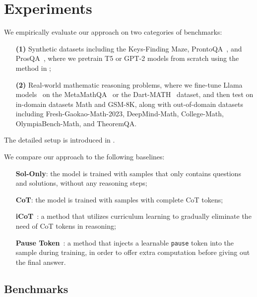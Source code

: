 \section{Experiments}
\label{sec:expr}
We empirically evaluate our approach on two categories of benchmarks: 
\vspace{-5pt}
\begin{enumerate}\itemsep0pt
    \item[\textbf{(1)}] Synthetic datasets including the Keys-Finding Maze, ProntoQA~\cite{saparov2022language}, and ProsQA~\cite{hao2024training}, where we pretrain T5 or GPT-2 models from scratch using the method in ;
    \item[\textbf{(2)}] Real-world mathematic reasoning problems, where we fine-tune Llama models~\cite{dubey2024llama} on the MetaMathQA~\cite{yu2023metamath} or the Dart-MATH~\cite{tong2024dart} dataset, and then test on in-domain datasets Math and GSM-8K, along with out-of-domain datasets including Fresh-Gaokao-Math-2023, DeepMind-Math, College-Math, OlympiaBench-Math, and TheoremQA. 
\end{enumerate}
The detailed setup is introduced in .

We compare our approach to the following baselines:
\vspace*{-10pt}
\begin{enumerate}[leftmargin=0pt]\itemsep0pt
    \item[] \textbf{Sol-Only}:  the model is trained with samples that only contains questions and solutions, without any reasoning steps;
    \item[] \textbf{CoT}: the model is trained with samples with complete CoT tokens; 
    \item[] \textbf{iCoT}~\citep{deng2024explicit}: a method that utilizes curriculum learning to gradually eliminate the need of CoT tokens in reasoning;
    \item[] \textbf{Pause Token}~\citep{goyal2023think}:  a method that injects a learnable \texttt{pause} token into the sample during training, in order to offer extra computation before giving out the final answer.

\end{enumerate}



\subsection{Benchmarks}
\label{sec:expr_benchmark}

